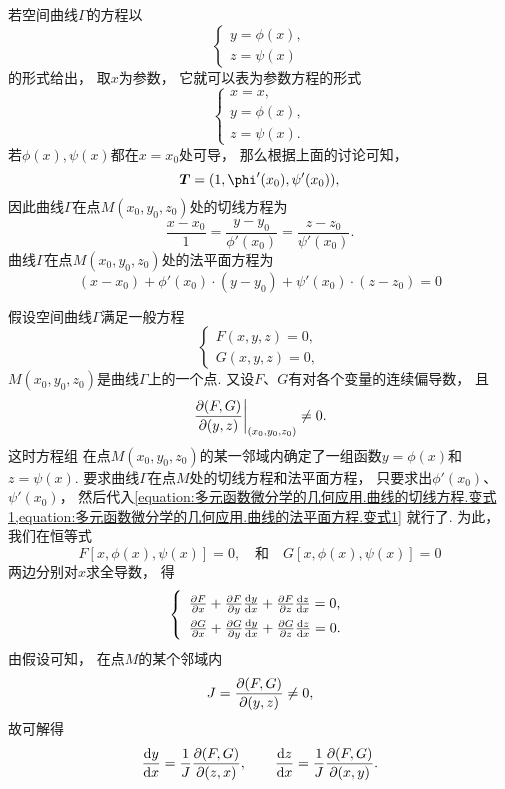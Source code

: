 若空间曲线\(\Gamma\)的方程以\[
	\left\{ \begin{array}{l}
		y = \phi(x), \\
		z = \psi(x)
	\end{array} \right.
\]的形式给出，
取\(x\)为参数，
它就可以表为参数方程的形式\[
	\left\{ \begin{array}{l}
		x = x, \\
		y = \phi(x), \\
		z = \psi(x).
	\end{array} \right.
\]
若\(\phi(x),\psi(x)\)都在\(x=x_0\)处可导，
那么根据上面的讨论可知，\[
	\vb{T} = (1,\phi'(x_0),\psi'(x_0)),
\]
因此曲线\(\Gamma\)在点\(M(x_0,y_0,z_0)\)处的切线方程为
\begin{equation}\label{equation:多元函数微分学的几何应用.曲线的切线方程.变式1}
	\frac{x-x_0}{1}
	=\frac{y-y_0}{\phi'(x_0)}
	=\frac{z-z_0}{\psi'(x_0)}.
\end{equation}
曲线\(\Gamma\)在点\(M(x_0,y_0,z_0)\)处的法平面方程为
\begin{equation}\label{equation:多元函数微分学的几何应用.曲线的法平面方程.变式1}
	(x-x_0) + \phi'(x_0) \cdot (y-y_0) + \psi'(x_0) \cdot (z-z_0) = 0
\end{equation}

假设空间曲线\(\Gamma\)满足一般方程 
\[
	\left\{ \begin{array}{l}
		F(x,y,z) = 0, \\
		G(x,y,z) = 0,
	\end{array} \right.
\]
\(M(x_0,y_0,z_0)\)是曲线\(\Gamma\)上的一个点.
又设\(F\)、\(G\)有对各个变量的连续偏导数，
且\[
	\eval{\jacobi{F,G}{y,z}}_{(x_0,y_0,z_0)} \neq 0.
\]
这时方程组 
在点\(M(x_0,y_0,z_0)\)的某一邻域内确定了一组函数\(y=\phi(x)\)和\(z=\psi(x)\).
要求曲线\(\Gamma\)在点\(M\)处的切线方程和法平面方程，
只要求出\(\phi'(x_0)\)、\(\psi'(x_0)\)，
然后代入\cref{equation:多元函数微分学的几何应用.曲线的切线方程.变式1,equation:多元函数微分学的几何应用.曲线的法平面方程.变式1} 就行了.
为此，我们在恒等式\[
	F[x,\phi(x),\psi(x)] = 0,
	\quad\text{和}\quad
	G[x,\phi(x),\psi(x)] = 0
\]两边分别对\(x\)求全导数，
得\[
	\left\{ \def\arraystretch{1.5} \begin{array}{l}
		\pdv{F}{x} + \pdv{F}{y} \dv{y}{x} + \pdv{F}{z} \dv{z}{x} = 0, \\
		\pdv{G}{x} + \pdv{G}{y} \dv{y}{x} + \pdv{G}{z} \dv{z}{x} = 0.
	\end{array} \right.
\]
由假设可知，
在点\(M\)的某个邻域内\[
	J = \pdv{ (F,G) }{ (y,z) } \neq 0,
\]
故可解得\[
	\dv{y}{x} = \frac{1}{J} \pdv{ (F,G) }{ (z,x) },
	\qquad
	\dv{z}{x} = \frac{1}{J} \pdv{ (F,G) }{ (x,y) }.
\]

